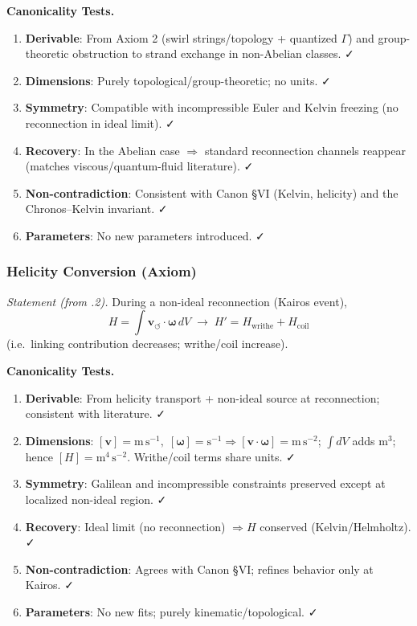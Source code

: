 \documentclass[10pt,reprint,aps,onecolumn,nofootinbib]{revtex4-2}
\begin{document}
    \textbf{Canonicality Tests.}
    \begin{enumerate}
        \item \textbf{Derivable}: From Axiom 2 (swirl strings/topology + quantized $\Gamma$) and group-theoretic obstruction to strand exchange in non-Abelian classes. ✓
        \item \textbf{Dimensions}: Purely topological/group-theoretic; no units. ✓
        \item \textbf{Symmetry}: Compatible with incompressible Euler and Kelvin freezing (no reconnection in ideal limit). ✓
        \item \textbf{Recovery}: In the Abelian case $\Rightarrow$ standard reconnection channels reappear (matches viscous/quantum-fluid literature). ✓
        \item \textbf{Non-contradiction}: Consistent with Canon §VI (Kelvin, helicity) and the Chronos–Kelvin invariant. ✓
        \item \textbf{Parameters}: No new parameters introduced. ✓
    \end{enumerate}

    \subsubsection{Helicity Conversion (Axiom)}
    \emph{Statement (from .2).} During a non-ideal reconnection (Kairos event),
    \[
        H=\!\int \mathbf{v}_{\!\boldsymbol{\circlearrowleft}}\!\cdot\!\boldsymbol{\omega}\, dV
        \;\to\; H' = H_{\text{writhe}} + H_{\text{coil}}
    \]
    (i.e.\ linking contribution decreases; writhe/coil increase).

    \textbf{Canonicality Tests.}
    \begin{enumerate}
        \item \textbf{Derivable}: From helicity transport + non-ideal source at reconnection; consistent with literature. ✓
        \item \textbf{Dimensions}: $[\mathbf{v}]=\mathrm{m\,s^{-1}},\; [\boldsymbol{\omega}]=\mathrm{s^{-1}}\Rightarrow [\mathbf{v}\!\cdot\!\boldsymbol{\omega}]=\mathrm{m\,s^{-2}}$; $\int dV$ adds $\mathrm{m^3}$; hence $[H]=\mathrm{m^4\,s^{-2}}$. Writhe/coil terms share units. ✓
        \item \textbf{Symmetry}: Galilean and incompressible constraints preserved except at localized non-ideal region. ✓
        \item \textbf{Recovery}: Ideal limit (no reconnection) $\Rightarrow H$ conserved (Kelvin/Helmholtz). ✓
        \item \textbf{Non-contradiction}: Agrees with Canon §VI; refines behavior only at Kairos. ✓
        \item \textbf{Parameters}: No new fits; purely kinematic/topological. ✓
    \end{enumerate}
\end{document}
